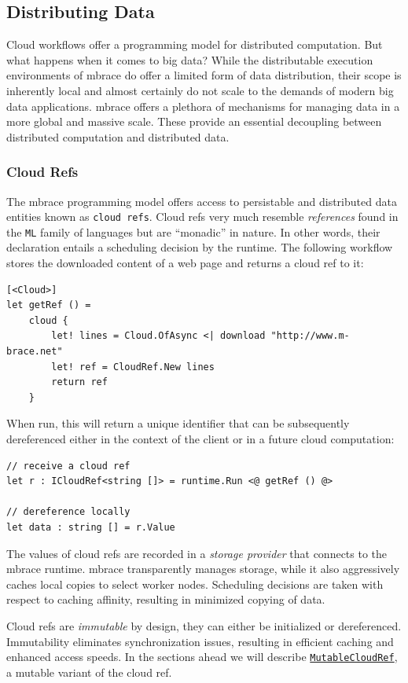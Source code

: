 \documentclass[9pt,a4paper]{article}
\newcommand{\mbrace}{mbrace}
\newcommand{\Mbrace}{\mbrace}
\begin{document}
\subsection{Distributing Data}

Cloud workflows offer a programming model for distributed computation.
But what happens when it comes to big data?
While the distributable execution environments of \mbrace{} do offer a
limited form of data distribution, their scope is inherently local
and almost certainly do not scale to the demands of modern big data applications.
\Mbrace{} offers a plethora of mechanisms for managing data in a more global and massive
scale. These provide an essential decoupling between distributed computation and
distributed data.

\subsubsection*{Cloud Refs}

The \mbrace{} programming model offers access to persistable and distributed data entities
known as \texttt{cloud refs}. Cloud refs very much resemble \emph{references} found in the 
\texttt{ML} family of languages but are “monadic” in nature. In other words, their declaration
entails a scheduling decision by the runtime. The following workflow stores the downloaded
content of a web page
and returns a cloud ref to it:
\begin{lstlisting}
[<Cloud>]
let getRef () =
    cloud {
        let! lines = Cloud.OfAsync <| download "http://www.m-brace.net"
        let! ref = CloudRef.New lines
        return ref
    }
\end{lstlisting}
When run, this will return a unique identifier that can be subsequently 
dereferenced either in the context of the client or in a future cloud computation:
\begin{lstlisting}
// receive a cloud ref
let r : ICloudRef<string []> = runtime.Run <@ getRef () @>

// dereference locally
let data : string [] = r.Value
\end{lstlisting}

The values of cloud refs are recorded in a \emph{storage provider} that
connects to the \mbrace{} runtime. \Mbrace{} transparently manages storage,
while it also aggressively caches local copies to select worker nodes.
Scheduling decisions are taken with respect to caching affinity, 
resulting in minimized copying of data.

Cloud refs are \emph{immutable} by design, they can either be initialized or dereferenced.
Immutability eliminates synchronization issues, resulting in efficient caching 
and enhanced access speeds. In the sections ahead we will describe
\hyperref[mutableCloudRef]{\texttt{MutableCloudRef}}, a mutable variant of the cloud ref.
\end{document}
